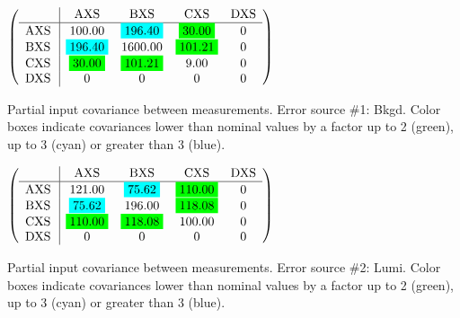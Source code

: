 \begin{table}[H]
\scriptsize
\begin{center}
\renewcommand{\arraystretch}{1.1}
\begin{math}\left(\begin{array}{c|cccc}
 & \mathrm{AXS} & 
\mathrm{BXS} & 
\mathrm{CXS} & 
\mathrm{DXS} \\
\hline
\mathrm{AXS} \hspace*{2pt} &     100.00 &  \colorbox{Cyan1}{$    196.40$} &  \colorbox{Green1}{$     30.00$} &  0 \\
\mathrm{BXS} \hspace*{2pt} &  \colorbox{Cyan1}{$    196.40$} &    1600.00 &  \colorbox{Green1}{$    101.21$} &  0 \\
\mathrm{CXS} \hspace*{2pt} &  \colorbox{Green1}{$     30.00$} &  \colorbox{Green1}{$    101.21$} &       9.00 &  0 \\
\mathrm{DXS} \hspace*{2pt} &  0 &  0 &  0 &  0 \\
\end{array}\right)\end{math}
\caption{Partial input covariance between measurements. Error source \#1: Bkgd. Color boxes indicate covariances lower than nominal values by a factor up to 2 (green), up to 3 (cyan) or greater than 3 (blue).}
\renewcommand{\arraystretch}{1}
\end{center}
\end{table}
\begin{table}[H]
\scriptsize
\begin{center}
\renewcommand{\arraystretch}{1.1}
\begin{math}\left(\begin{array}{c|cccc}
 & \mathrm{AXS} & 
\mathrm{BXS} & 
\mathrm{CXS} & 
\mathrm{DXS} \\
\hline
\mathrm{AXS} \hspace*{2pt} &     121.00 &  \colorbox{Cyan1}{$     75.62$} &  \colorbox{Green1}{$    110.00$} &  0 \\
\mathrm{BXS} \hspace*{2pt} &  \colorbox{Cyan1}{$     75.62$} &     196.00 &  \colorbox{Green1}{$    118.08$} &  0 \\
\mathrm{CXS} \hspace*{2pt} &  \colorbox{Green1}{$    110.00$} &  \colorbox{Green1}{$    118.08$} &     100.00 &  0 \\
\mathrm{DXS} \hspace*{2pt} &  0 &  0 &  0 &  0 \\
\end{array}\right)\end{math}
\caption{Partial input covariance between measurements. Error source \#2: Lumi. Color boxes indicate covariances lower than nominal values by a factor up to 2 (green), up to 3 (cyan) or greater than 3 (blue).}
\renewcommand{\arraystretch}{1}
\end{center}
\end{table}
\clearpage

